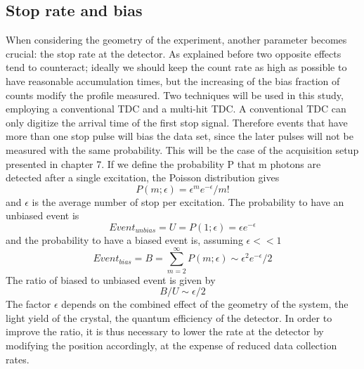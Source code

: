 \subsection{Stop rate and bias}
When considering the geometry of the experiment, another parameter becomes crucial: the stop rate at the detector.
As explained before two opposite effects tend to counteract; ideally we should keep the count rate as high as possible to have reasonable accumulation times, but the increasing of the bias fraction of counts modify the profile measured.
Two techniques will be used in this study, employing a conventional TDC and a multi-hit TDC.
A conventional TDC can only digitize the arrival time of the first stop signal. Therefore events that have more than one stop pulse will bias the data set, since the later pulses will not be measured with the same probability. This will be the case of the acquisition setup presented in chapter 7.
If we define the probability P that m photons are detected after a single excitation, the Poisson distribution gives
\begin{equation}
P(m;\epsilon) = \epsilon ^{m} e ^{-\epsilon} / m!
\end{equation}
and $\epsilon$ is the average number of stop per excitation.
The probability to have an unbiased event is
\begin{equation}
Event_{unbias} = U = P(1;\epsilon) = \epsilon e ^{-\epsilon}
\end{equation}
and the probability to have a biased event is, assuming $\epsilon << 1$
\begin{equation}
Event_{bias} = B = \sum _{m = 2} ^{\infty} P(m;\epsilon) \sim \epsilon ^{2} e ^{-\epsilon} / 2
\end{equation}
The ratio of biased to unbiased event is given by
\begin{equation}
B/U \sim \epsilon / 2
\end{equation}
The factor $\epsilon$ depends on the combined effect of the geometry of the system, the light yield of the crystal, the quantum efficiency of the detector. In order to improve the ratio, it is thus necessary to lower the rate at the detector by modifying the position accordingly, at the expense of reduced data collection rates.

